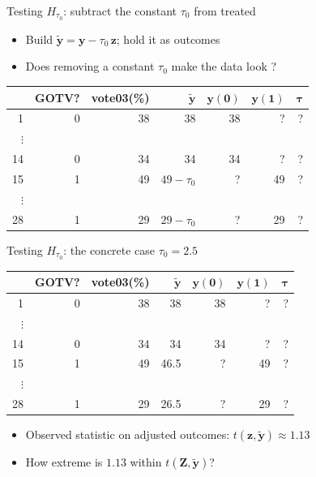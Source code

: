 \documentclass[table, xcolor = {dvipsnames}, 9pt]{beamer}
\theoremstyle{plain}
\newcommand{\mh}[1]{{\color{magenta}{#1}}}
\begin{document}
\begin{frame}[t]{Testing $H_{\tau_0}$: subtract the constant $\tau_0$ from treated}
\begin{itemize} \vfill
\item Build $\tilde{\bm{y}} = \bm{y} - \tau_0\,\bm{z}$; hold it \mh{fixed} as outcomes \vfill
\item Does removing a constant $\tau_0$ make the data look \mh{null}? \vfill
\end{itemize}
\begin{center}
  \begin{tabular}{r|rr|rrrr}
  \hline
 & GOTV? & vote03(\%)& $\bm{\tilde{y}}$ & $\bm{y}(\bm{0})$ & $\bm{y}(\bm{1})$ & $\bm{\tau}$\\
  \hline
1 & 0 & 38 & 38 & 38 & ? & ?\\
$\vdots$& & & & & & \\
14 & 0 & 34 & 34 & 34& ? & ?\\
15 & 1 & 49 & $49 - \tau_0$ & ?& 49 & ?\\
$\vdots$& & & & & & \\
28 & 1 & 29 & $29 - \tau_0$ & ?& 29 & ? \\
   \hline
\end{tabular}
\end{center}
\end{frame}
\begin{frame}[t]{Testing $H_{\tau_0}$: the concrete case $\tau_0 = 2.5$}
\begin{center}
  \begin{tabular}{r|rr|rrrr}
  \hline
 & GOTV? & vote03(\%)& $\bm{\tilde{y}}$ & $\bm{y}(\bm{0})$ & $\bm{y}(\bm{1})$ & $\bm{\tau}$\\
  \hline
1 & 0 & 38 & 38 & 38 & ? & ?\\
$\vdots$& & & & & & \\
14 & 0 & 34 & 34 & 34& ? & ?\\
15 & 1 & 49 & 46.5 & ?& 49 & ?\\
$\vdots$& & & & & & \\
28 & 1 & 29 & 26.5 & ?& 29 & ? \\
   \hline
\end{tabular}
\end{center}
\begin{itemize} \vfill
\item Observed statistic on adjusted outcomes: $t(\bm{z}, \tilde{\bm{y}}) \approx 1.13$ \vfill
\item How extreme is $1.13$ within $t(\bm{Z}, \tilde{\bm{y}})$? \vfill
\end{itemize}
\end{frame}
\end{document}
